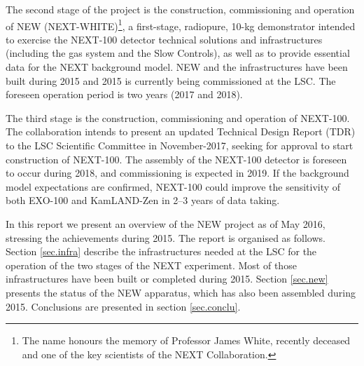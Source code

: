 The second stage of the project is the construction, commissioning and operation of NEW (NEXT-WHITE)\footnote{The name honours the memory of Professor James White, recently deceased and one of the key scientists of the NEXT Collaboration.}, a first-stage, radiopure, 10-kg demonstrator intended to exercise the NEXT-100 detector technical solutions and infrastructures (including the gas system and the Slow Controls), as well as to provide essential data for the NEXT background model. NEW and the infrastructures have been built during 2015 and 2015 is currently being commissioned at the LSC. The foreseen operation period is two years (2017 and 2018). 

The third stage is the construction, commissioning and operation of NEXT-100. The collaboration intends to present an updated Technical Design Report (TDR) to the LSC Scientific Committee in November-2017, seeking for approval to start construction of NEXT-100. The assembly of the NEXT-100 detector is foreseen to occur during 2018, and commissioning is expected in 2019. If the background model expectations are confirmed, NEXT-100 could improve the sensitivity of both EXO-100 and KamLAND-Zen in 2--3 years of data taking\cite{Martin-Albo:2015rhw}. 

In this report we present an overview of the NEW project as of May 2016, stressing the achievements during 2015. The report is organised as follows. Section \ref{sec.infra} describe the infrastructures needed at the LSC for the operation of the two stages of the NEXT experiment.  Most of those infrastructures have been built or completed during 2015. Section \ref{sec.new} presents the status of the NEW apparatus, which has also been assembled during 2015. Conclusions are presented in section \ref{sec.conclu}.




